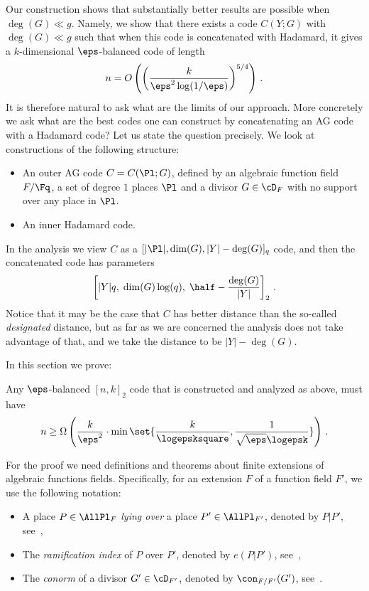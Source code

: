 Our construction shows that substantially better results are
possible when $\deg(G) \ll g$. Namely, we show that there exists a
code $C(Y;G)$ with $\deg(G) \ll g$ such that when this code is
concatenated with Hadamard, it gives a 
%
$k$-dimensional
$\eps$-balanced code of length 
\[
n=O\left(\left(\frac{k}{\eps^2
\log(1/\eps)}\right)^{5/4}\right)\,.
\]
It is therefore natural to ask what
are the limits of our approach. More concretely we ask what are the
best codes one can construct by concatenating an AG code with a
Hadamard code? Let us state the question precisely. We look at
constructions of the following structure:

\begin{itemize}
\item
An outer AG code $C=C(\Pl;G)$, defined by an algebraic function
field $F/\Fq$, a set of degree $1$ places $\Pl$ and a divisor $G \in
\cD_F$ with no support over any place in $\Pl$.

\item An inner Hadamard code.
\end{itemize}

In the analysis we view $C$ as a $[|\Pl|,\dim(G),|Y|-\deg(G)]_q$
code, and then the concatenated code has parameters
\[
\left[|Y|
q,\; \dim(G) \log(q),\; \half-\frac{\deg(G)}{|Y|}\right]_2\,.
\]
 Notice that it may
be the case that $C$ has better distance than the so-called
\emph{designated} distance, but as far as we are concerned the
analysis does not take advantage of that, and we take the distance
to be $|Y|-\deg(G)$.

In this section we prove:
\begin{theorem}
\label{thm:lower} Any $\eps$-balanced $[n,k]_2$ code that is
constructed and analyzed as above, must have
$$n \ge \Omega\left(\frac{k}{\eps^2} \cdot \min\set{\frac{k}{\logepsksquare},\frac{1}{\sqrt{\eps} \logepsk}}\right)\,.$$
\end{theorem}


For the proof we need definitions and theorems about finite
extensions of algebraic functions fields. Specifically, for an
extension $F$ of a function field $F'$, we use the following
notation:

\begin{itemize}
\item
A place $P \in \AllPl_{F}$ \emph{lying over} a place $P' \in \AllPl_{F'}$,
denoted by $P|P'$, see~\cite[Def III.1.3]{S:93},
\item
The \emph{ramification index} of $P$ over $P'$, denoted by $e(P|P')$, see~\cite[Def III.1.5]{S:93},
\item
The \emph{conorm} of a divisor $G' \in \cD_{F'}$, denoted by
$\con_{F/F'}(G')$, see~\cite[Def III.1.8]{S:93}.
\end{itemize}

